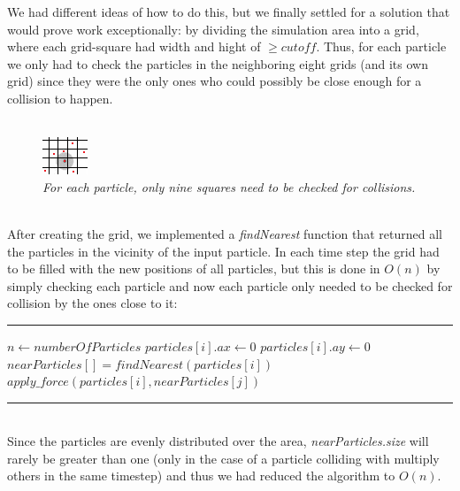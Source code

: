 \documentclass[11pt,a4paper]{article}
\begin{document}
We had different ideas of how to do this, but we finally settled for a solution that would prove work exceptionally: by dividing the simulation area into a grid, where each grid-square had width and hight of $\geq cutoff$. Thus, for each particle we only had to check the particles in the neighboring eight grids (and its own grid) since they were the only ones who could possibly be close enough for a collision to happen.
\\
\\
\begin{figure}[htb]
\centering
\includegraphics[scale=3]{pics/grid.png}
\caption{\emph{For each particle, only nine squares need to be checked for collisions.}}
\label{fig:gird}
\end{figure}
\\
After creating the grid, we implemented a \emph{findNearest} function that returned all the particles in the vicinity of the input particle. In each time step the grid had to be filled with the new positions of all particles, but this is done in $O(n)$ by simply checking each particle and now each particle only needed to be checked for collision by the ones close to it:
\\
\rule{125mm}{0.1pt}
\begin{algorithmic}
\STATE $n \gets numberOfParticles$
	\STATE $particles[i].ax \gets 0$
	\STATE $particles[i].ay \gets 0$
	\STATE $nearParticles[] = findNearest(particles[i])$
			\STATE $apply\_force(particles[i],nearParticles[j])$
	\ENDFOR
\ENDFOR 
\end{algorithmic}
\rule{125mm}{0.1pt}
\vspace{10pt}
\\
Since the particles are evenly distributed over the area, \emph{nearParticles.size} will rarely be greater than one (only in the case of a particle colliding with multiply others in the same timestep) and thus we had reduced the algorithm to $O(n)$.
\end{document}
